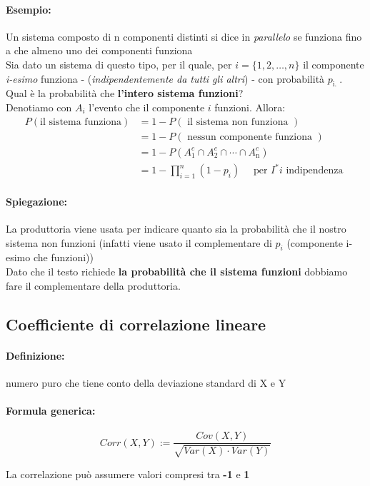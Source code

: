 \documentclass[]{article}
\newcommand{\definizione}{\paragraph{Definizione:}}
\newcommand{\formula}{\paragraph{Formula generica:}}
\begin{document}
    \paragraph{Esempio:} Un sistema composto di n componenti distinti si dice in \textit{parallelo} se funziona fino a che almeno uno dei componenti funziona \\
    Sia dato un sistema di questo tipo, per il quale, per $i=\{1,2, \ldots, n\}$ il componente \textit{i-esimo} funziona - (\textit{indipendentemente da tutti gli altri}) - con probabilità $p_{\text {i. }}$. \\
    Qual è la probabilità che \textbf{l'intero sistema funzioni}? \\
    Denotiamo con $A_i$ l'evento che il componente $i$ funzioni. Allora:
    $$
    \begin{aligned}
        P(\text{il sistema funziona}) & =1-P(\text { il sistema non funziona }) \\
        & =1-P(\text { nessun componente funziona }) \\
        & =1-P\left(A_1^c \cap A_2^c \cap \cdots \cap A_{\mathrm{n}}^c\right) \\
        & =1-\prod_{i=1}^n\left(1-p_i\right) \quad \text { per } I^* i \text { indipendenza }
    \end{aligned}
    $$
    \paragraph{Spiegazione:} La produttoria viene usata per indicare quanto sia la probabilità che il nostro sistema non funzioni (infatti viene usato il complementare di \textit{$p_i$} (componente i-esimo che funzioni)) \\
    Dato che il testo richiede \textbf{la probabilità che il sistema funzioni} dobbiamo fare il complementare della produttoria.
    
    \subsection{Coefficiente di correlazione lineare}
    \definizione numero puro che tiene conto della deviazione standard di X e Y
    \formula
    \begin{equation*}
        Corr(X,Y) := \frac{Cov(X,Y)}{\sqrt{Var(X) \cdot Var(Y)}}
    \end{equation*}

    \begin{center}
        La correlazione può assumere valori compresi tra \textbf{-1} e \textbf{1}
    \end{center}
     \\
     \\
     \\
\end{document}
